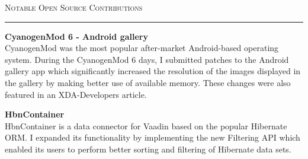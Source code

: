 \documentclass[10pt, a4paper, final, onecolumn, oneside, notitlepage]{article}
\newcommand{\sectionspacing}[0]{ \vspace{10pt} } %
\newcommand{\halfsectionspacing}[0]{ \vspace{4pt} }
\newcommand{\sectionrule}[0]{ \rule[6pt]{\textwidth}{0.5pt} } %
\renewcommand{\section}[1]{\sectionspacing {\large \scshape #1} \sectionrule}
\begin{document}
\begin{center}
\begin{flushleft}
\end{flushleft}


\section{Notable Open Source Contributions}
\begin{flushleft}

\textbf{CyanogenMod 6 - Android gallery} \\
CyanogenMod was the most popular after-market Android-based operating system. During the CyanogenMod 6 days, I submitted patches to the Android gallery app which significantly increased the resolution of the images displayed in the gallery by making better use of available memory. These changes were also featured in an XDA-Developers article.

\halfsectionspacing

\textbf{HbnContainer} \\
HbnContainer is a data connector for Vaadin based on the popular Hibernate ORM. I expanded its functionality by implementing the new Filtering API which enabled its users to perform better sorting and filtering of Hibernate data sets.

\end{flushleft}




\end{center}
\end{document}
